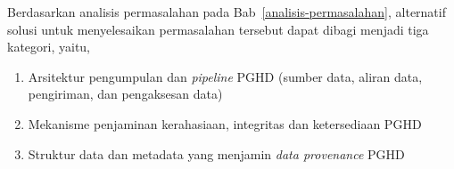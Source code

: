 Berdasarkan analisis permasalahan pada Bab~\ref{analisis-permasalahan}, alternatif solusi untuk menyelesaikan permasalahan tersebut dapat dibagi menjadi tiga kategori, yaitu,

\begin{enumerate}
    \item Arsitektur pengumpulan dan \textit{pipeline} PGHD (sumber data, aliran data, pengiriman, dan pengaksesan data)
    \item Mekanisme penjaminan kerahasiaan, integritas dan ketersediaan PGHD
    \item Struktur data dan metadata yang menjamin \textit{data provenance} PGHD
\end{enumerate}






